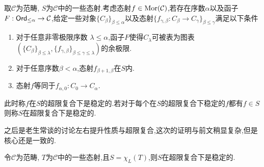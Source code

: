 \begin{definition}[超限复合下稳定]
    取$\mathcal{C}$为范畴, $S$为$\mathcal{C}$中的一些态射.考虑态射$f\in \operatorname{Mor}(\mathcal{C})$,若存在序数$\alpha$以及函子$F: \mathsf{Ord}_{\leq \alpha} \to \mathcal{C}$,给定一些对象$\{C_{\beta}\}_{\beta \leq \alpha}$以及态射$\{f_{\gamma,\beta}:C_{\beta}\to C_{\gamma}\}_{\beta \leq \gamma}$满足以下条件
    \begin{enumerate}
        \item 对于任意非零极限序数 $\lambda \leq \alpha$,函子$F$使得$C_{\lambda}$可被表为图表$\left(\{C_{\beta}\}_{\beta \leq \lambda}, \{f_{\gamma,\beta}\}_{\beta \leq \gamma \leq \lambda}\right)$的余极限.
        \item 对于任意序数$\beta < \alpha$,态射$f_{\beta+1,\beta}$在$S$内.
        \item 态射$f$等同于$f_{\alpha,0} : C_0 \to C_{\alpha}$.
    \end{enumerate}
    此时称$f$在$S$的超限复合下是稳定的.若对于每个在$S$的超限复合下稳定的$f$都有$f\in S$则称$S$在超限复合下是稳定的.
\end{definition}
之后是老生常谈的讨论左右提升性质与超限复合,这次的证明与前文稍显复杂,但是核心还是一致的.
\begin{proposition}
    令$\mathcal{C}$为范畴, $T$为$\mathcal{C}$中的一些态射,且$S = \chi_L(T)$,则$S$在超限复合下是稳定的.
\end{proposition}

